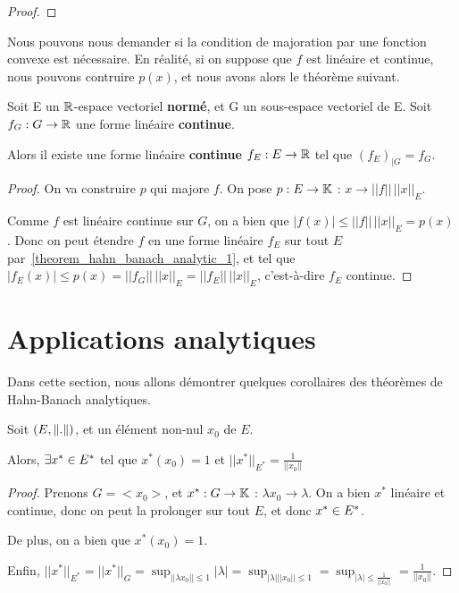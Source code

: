\begin{proof}

\end{proof}

Nous pouvons nous demander si la condition de majoration par une fonction
convexe est nécessaire. En réalité, si on suppose que $f$ est linéaire et
continue, nous pouvons contruire $p(x)$, et nous avons alors le théorème
suivant.

\begin{theorem} 
\label{theorem_hahn_banach_analytic_2}
	Soit E un $\mathbb{R}$-espace vectoriel \textbf{normé}, et G un sous-espace
	vectoriel de E.
	Soit $f_{G} : G \rightarrow \mathbb{R}$ une forme linéaire
	\textbf{continue}.

	Alors il existe une forme linéaire \textbf{continue}
	$f_{E} : E \rightarrow \mathbb{R}$ tel que $(f_{E})_{|G} = f_{G}$.
\end{theorem}

\begin{proof}
	On va construire $p$ qui majore $f$.
	On pose $p : E \rightarrow \mathbb{K}$ : $x \rightarrow ||f|| \,
	||x||_{E}$.

	Comme $f$ est linéaire continue sur $G$, on a bien que $|f(x)| \leq ||f|| \,
	||x||_{E} = p(x)$. Donc on peut étendre $f$ en une forme linéaire $f_{E}$
	sur tout $E$ par~\ref{theorem_hahn_banach_analytic_1}, et tel que
	$|f_{E}(x)| \leq p(x) = ||f_{G}|| \, ||x||_{E} = ||f_{E}|| \, ||x||_{E}$,
	c'est-à-dire $f_{E}$ continue.
\end{proof}
\section{Applications analytiques}

Dans cette section, nous allons démontrer quelques corollaires des théorèmes de
Hahn-Banach analytiques.

\begin{corollary}
	Soit $(E, \norm{.})$, et un élément non-nul $x_{0}$ de $E$.

	Alors, $\exists x^{*} \in E^{*}$ tel que $x^{*}(x_{0}) = 1$ et
	$||x^{*}||_{E^{*}} = \frac{1}{||x_{0}||}$
\end{corollary}

\begin{proof}
	Prenons $G = <x_{0}>$, et $x^{*} : G \rightarrow \mathbb{K}$ : $\lambda
	x_{0} \rightarrow \lambda$. On a bien $x^{*}$ linéaire et continue, donc on peut
	la prolonger sur tout $E$, et donc $x^{*} \in E^{*}$.

	De plus, on a bien que $x^{*}(x_{0}) = 1$.

	Enfin, $||x^{*}||_{E^{*}} = ||x^{*}||_{G} = \displaystyle \sup_{||\lambda x_{0}|| \leq
1}|\lambda| = \sup_{|\lambda|||x_{0}|| \leq 1} = \sup_{|\lambda| \leq
	\frac{1}{||x_{0}||}} = \frac{1}{||x_{0}||}$.
\end{proof}

